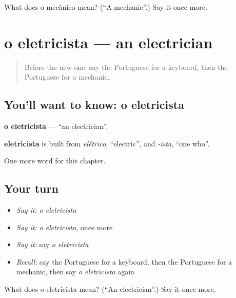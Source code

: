 \begin{tcolorbox}[breakable,colback=teal!4,colframe=teal!35!black,title={Before you move on}]
What does o mecânico mean? (\textquotedblleft{}A mechanic\textquotedblright{}.) Say it once more.
\end{tcolorbox}
\section[o eletricista]{o eletricista — an electrician}

\label{lesson:PT-C246-eletricista}



\begin{quote}
Before the new one: say the Portuguese for a keyboard, then the Portuguese for a mechanic.
\end{quote}

\subsection*{You'll want to know: o eletricista}
\textbf{o eletricista} — \textquotedblleft{}an electrician\textquotedblright{}.

\begin{cousinweb}
\textbf{eletricista} is built from \emph{elétrico}, \textquotedblleft{}electric\textquotedblright{}, and \emph{-ista}, \textquotedblleft{}one who\textquotedblright{}.
\end{cousinweb}

\begin{grammarlens}[title={What you've built}]
One more word for this chapter.
\end{grammarlens}

\subsection*{Your turn}
\begin{itemize}
\raggedright
  \item \emph{Say it:} \emph{o eletricista}
  \item \emph{Say it:} \emph{o eletricista}, once more
  \item \emph{Say it:} say \emph{o eletricista}
  \item \emph{Recall:} say the Portuguese for a keyboard, then the Portuguese for a mechanic, then say \emph{o eletricista} again
\end{itemize}

\begin{tcolorbox}[breakable,colback=teal!4,colframe=teal!35!black,title={Before you move on}]
What does o eletricista mean? (\textquotedblleft{}An electrician\textquotedblright{}.) Say it once more.
\end{tcolorbox}
